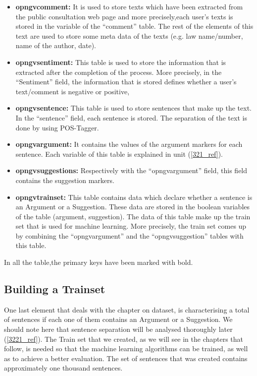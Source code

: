 \begin{itemize}

	\item \textbf{opngv\textunderscore comment:} It is used to store texts which have been extracted from the public consultation web page and more precisely,each user's texts is stored in the variable of the ``comment'' table. The rest of the elements of this text are used to store some meta data of the texts (e.g. law name/number, name of the author, date).
	\item \textbf{opngv\textunderscore sentiment:} This table is used to store the information that is extracted after the completion of the process. More precisely, in the ``Sentiment'' field, the information that is stored defines whether a user's text/comment is negative or positive,
	\item \textbf{opngv\textunderscore sentence:} This table is used to store sentences that make up the text. In the ``sentence'' field, each sentence is stored. The separation of the text is done by using POS-Tagger.
	\item \textbf{opngv\textunderscore argument:} It contains the values of the argument markers for each sentence. Each variable of this table is explained in unit (\ref{321_ref}).
	\item \textbf{opngv\textunderscore suggestions:} Respectively with the ``opngvargument'' field, this field contains the suggestion markers.
	\item \textbf{opngv\textunderscore trainset:} This table contains data which declare whether a sentence is an Argument or a Suggestion. These data are stored in the boolean variables of the table (argument, suggestion). The data of this table make up the train set that is used for machine learning. More precisely, the train set comes up by combining the ``opngv\textunderscore argument'' and the ``opngv\textunderscore suggestion'' tables with this table.\\

\end{itemize}

In all the table,the primary keys have been marked with bold.

\subsection{Building a Trainset}\label{315_ref}
One last element that deals with the chapter on dataset, is characterising a total of sentences if each one of them contains an Argument or a Suggestion. We should note here that sentence separation will be analysed thoroughly later (\ref{3221_ref}). The Train set that we created, as we will see in the chapters that follow, is needed so that the machine learning algorithms can be trained, as well as to achieve a better evaluation. The set of sentences that was created contains approximately one thousand sentences.


